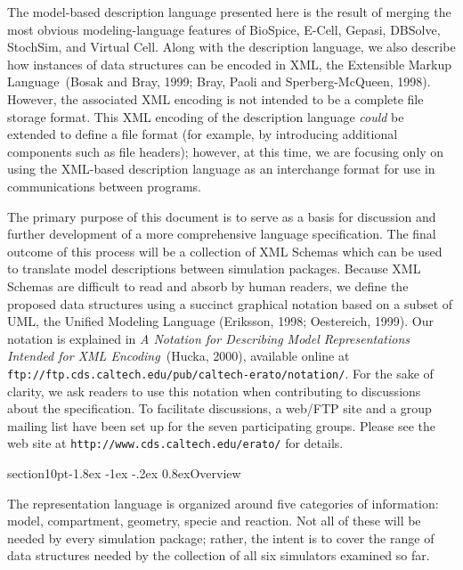 \documentclass[10pt]{article}
\makeatletter
\renewcommand{\section}{\@startsection%
  {section}{1}{0pt}{-1.8ex \@plus -1ex \@minus -.2ex}%
  {0.8ex}{\normalfont\Large\bfseries}}
\newcommand{\url}[1]{\textup{\texttt{#1}}}
\newcommand{\notationdocloc}{\url{ftp://ftp.cds.caltech.edu/pub/caltech-erato/notation/}}
\newcommand{\eratowebloc}{\url{http://www.cds.caltech.edu/erato/}}
\makeatother
\begin{document}
The model-based description language presented here is the result of
merging the most obvious modeling-language features of BioSpice, E-Cell,
Gepasi, DBSolve, StochSim, and Virtual Cell.  Along with the description
language, we also describe how instances of data structures can be encoded
in XML, the Extensible Markup Language~(Bosak and Bray, 1999; Bray, Paoli
and Sperberg-McQueen, 1998).  However, the associated XML encoding is not
intended to be a complete file storage format.  This XML encoding of the
description language \emph{could} be extended to define a file format (for
example, by introducing additional components such as file headers);
however, at this time, we are focusing only on using the XML-based
description language as an interchange format for use in communications
between programs.

The primary purpose of this document is to serve as a basis for discussion
and further development of a more comprehensive language specification.
The final outcome of this process will be a collection of XML Schemas which
can be used to translate model descriptions between simulation packages.
Because XML Schemas are difficult to read and absorb by human readers, we
define the proposed data structures using a succinct graphical notation
based on a subset of UML, the Unified Modeling Language (Eriksson, 1998;
Oestereich, 1999).  Our notation is explained in \emph{A Notation for
  Describing Model Representations Intended for XML Encoding}~(Hucka,
2000), available online at \notationdocloc{}.  For the sake of clarity, we
ask readers to use this notation when contributing to discussions about the
specification.  To facilitate discussions, a web/FTP site and a group
mailing list have been set up for the seven participating groups.  Please
see the web site at \eratowebloc{} for details.


\section{Overview} 
\label{sec:overview}

The representation language is organized around five categories of
information: model, compartment, geometry, specie and reaction.  Not all of
these will be needed by every simulation package; rather, the intent is to
cover the range of data structures needed by the collection of all six
simulators examined so far.
\end{document}
